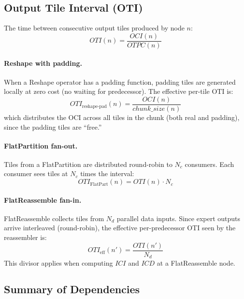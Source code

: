 \documentclass[10pt]{article}
\begin{document}
\subsection{Output Tile Interval (OTI)}

The time between consecutive output tiles produced by node $n$:
\begin{equation}
    \mathit{OTI}(n) = \frac{\mathit{OCI}(n)}{\mathit{OTPC}(n)}
\end{equation}

\paragraph{Reshape with padding.} When a Reshape operator has a padding function, padding tiles are generated locally at zero cost (no waiting for predecessor). The effective per-tile OTI is:
\begin{equation}
    \mathit{OTI}_{\text{reshape-pad}}(n) = \frac{\mathit{OCI}(n)}{\mathit{chunk\_size}(n)}
\end{equation}
which distributes the OCI across all tiles in the chunk (both real and padding), since the padding tiles are ``free.''

\paragraph{FlatPartition fan-out.} Tiles from a FlatPartition are distributed round-robin to $N_c$ consumers. Each consumer sees tiles at $N_c$ times the interval:
\begin{equation}
    \mathit{OTI}_{\text{FlatPart}}(n) = \mathit{OTI}(n) \cdot N_c
\end{equation}

\paragraph{FlatReassemble fan-in.} FlatReassemble collects tiles from $N_d$ parallel data inputs. Since expert outputs arrive interleaved (round-robin), the effective per-predecessor OTI seen by the reassembler is:
\begin{equation}
    \mathit{OTI}_{\text{eff}}(n') = \frac{\mathit{OTI}(n')}{N_d}
\end{equation}
This divisor applies when computing $\mathit{ICI}$ and $\mathit{ICD}$ at a FlatReassemble node.

\subsection{Summary of Dependencies}
\end{document}
